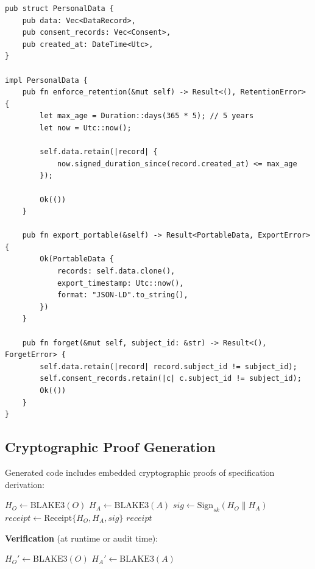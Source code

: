 \begin{verbatim}
pub struct PersonalData {
    pub data: Vec<DataRecord>,
    pub consent_records: Vec<Consent>,
    pub created_at: DateTime<Utc>,
}

impl PersonalData {
    pub fn enforce_retention(&mut self) -> Result<(), RetentionError> {
        let max_age = Duration::days(365 * 5); // 5 years
        let now = Utc::now();

        self.data.retain(|record| {
            now.signed_duration_since(record.created_at) <= max_age
        });

        Ok(())
    }

    pub fn export_portable(&self) -> Result<PortableData, ExportError> {
        Ok(PortableData {
            records: self.data.clone(),
            export_timestamp: Utc::now(),
            format: "JSON-LD".to_string(),
        })
    }

    pub fn forget(&mut self, subject_id: &str) -> Result<(), ForgetError> {
        self.data.retain(|record| record.subject_id != subject_id);
        self.consent_records.retain(|c| c.subject_id != subject_id);
        Ok(())
    }
}
\end{verbatim}

\subsection{Cryptographic Proof Generation}

Generated code includes embedded cryptographic proofs of specification derivation:

\begin{algorithm}
\caption{Cryptographic Receipt Generation}
\begin{algorithmic}[1]
    \State $H_O \gets \text{BLAKE3}(O)$ 
    \State $H_A \gets \text{BLAKE3}(A)$ 
    \State $sig \gets \text{Sign}_{sk}(H_O \| H_A)$ 
    \State $receipt \gets \text{Receipt}\{H_O, H_A, sig\}$
    \State \Return $receipt$
\EndProcedure
\end{algorithmic}
\end{algorithm}

\textbf{Verification} (at runtime or audit time):
\begin{algorithm}
\begin{algorithmic}[1]
    \State $H_O' \gets \text{BLAKE3}(O)$
    \State $H_A' \gets \text{BLAKE3}(A)$
        \State \Return {}
    \Else
        \State \Return {}
    \EndIf
\EndProcedure
\end{algorithmic}
\end{algorithm}

